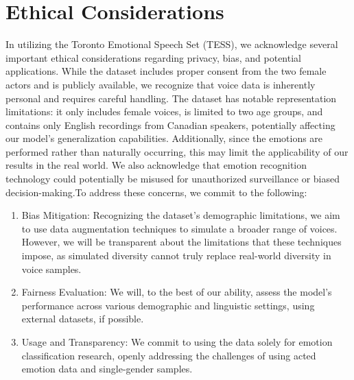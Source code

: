 \documentclass[../main.tex]{subfiles}
\begin{document}
\section{Ethical Considerations}
In utilizing the Toronto Emotional Speech Set (TESS), we acknowledge several 
important ethical considerations regarding privacy, bias, and potential 
applications. While the dataset includes proper consent from the two female 
actors and is publicly available, we recognize that voice data is inherently 
personal and requires careful handling. The dataset has notable representation 
limitations: it only includes female voices, is limited to two age groups, and 
contains only English recordings from Canadian speakers, potentially affecting 
our model's generalization capabilities. Additionally, since the emotions are 
performed rather than naturally occurring, this may limit the applicability of 
our results in the real world. We also acknowledge that emotion recognition 
technology could potentially be misused for unauthorized surveillance or biased 
decision-making.To address these concerns, we commit to the following: 

\begin{enumerate}
    \item Bias Mitigation: Recognizing the dataset's demographic limitations, we aim to 
    use data augmentation techniques to simulate a broader range of voices. However, 
    we will be transparent about the limitations that these techniques impose, as 
    simulated diversity cannot truly replace real-world diversity in voice samples.

    \item Fairness Evaluation: We will, to the best of our ability, assess the model's 
    performance across various demographic and linguistic settings, using external 
    datasets, if possible.

    \item Usage and Transparency: We commit to using the data solely for emotion 
    classification research, openly addressing the challenges of using acted 
    emotion data and single-gender samples.    
\end{enumerate}
\end{document}
